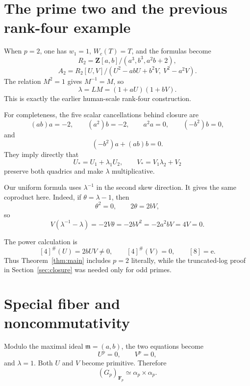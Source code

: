 \documentclass[11pt]{amsart}
\theoremstyle{definition}
\theoremstyle{remark}
\newcommand{\Z}{\mathbf Z}
\newcommand{\F}{\mathbf F}
\newcommand{\m}{\mathfrak m}
\newcommand{\unit}{\mathrm e}
\begin{document}
\section{The prime two and the previous rank-four example}

When \(p=2\), one has \(w_1=1\), \(W_c(T)=T\), and the formulas become
\begin{equation}\label{eq:p2-base-A}
 R_2=\Z[a,b]/(a^3,b^3,a^2b+2),
\end{equation}
\begin{equation}\label{eq:p2-A}
 A_2=R_2[U,V]/(U^2-abU+b^2V,\ V^2-a^2V).
\end{equation}
The relation \(M^2=1\) gives \(M^{-1}=M\), so
\begin{equation}\label{eq:p2-lambda}
 \lambda=LM=(1+aU)(1+bV).
\end{equation}
This is exactly the earlier human-scale rank-four construction.

For completeness, the five scalar cancellations behind closure are
\[
 (ab)a=-2,\qquad (a^2)b=-2,\qquad
 a^2a=0,\qquad (-b^2)b=0,
\]
and
\[
 (-b^2)a+(ab)b=0.
\]
They imply directly that
\[
 U_*=U_1+\lambda_1U_2,
 \qquad V_*=V_1\lambda_2+V_2
\]
preserve both quadrics and make \(\lambda\) multiplicative.

Our uniform formula uses \(\lambda^{-1}\) in the second skew direction.
It gives the same coproduct here.  Indeed, if
\(\theta=\lambda-1\), then
\[
 \theta^2=0,\qquad 2\theta=2bV,
\]
so
\[
 V(\lambda^{-1}-\lambda)
 =-2V\theta=-2bV^2=-2a^2bV=4V=0.
\]

The power calculation is
\begin{equation}\label{eq:p2-powers}
 [4]^\#(U)=2bUV\ne0,
 \qquad [4]^\#(V)=0,
 \qquad [8]=\unit.
\end{equation}
Thus Theorem~\ref{thm:main} includes \(p=2\) literally, while the
truncated-log proof in Section~\ref{sec:closure} was needed only for odd
primes.

\section{Special fiber and noncommutativity}

Modulo the maximal ideal \(\m=(a,b)\), the two equations become
\[
 U^p=0,\qquad V^p=0,
\]
and \(\lambda=1\).  Both \(U\) and \(V\) become primitive.  Therefore
\begin{equation}\label{eq:special-fiber}
 (G_p)_{\F_p}\simeq\alpha_p\times\alpha_p.
\end{equation}
\end{document}
